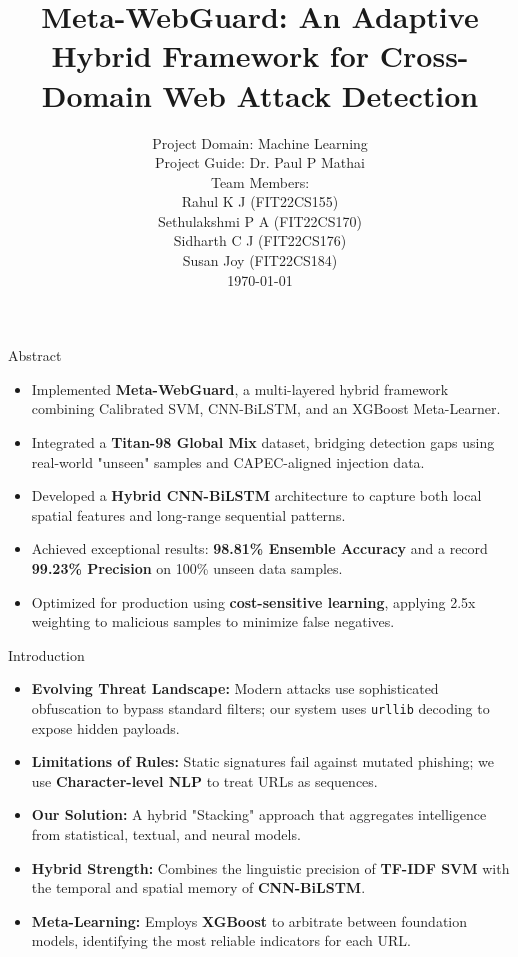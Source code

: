 \documentclass[aspectratio=169,xcolor=dvipsnames]{beamer}
\title{Meta-WebGuard: An Adaptive Hybrid Framework for Cross-Domain
Web Attack Detection}
\author{\small Project Domain: Machine Learning\\
Project Guide: Dr. Paul P Mathai\\
Team Members: \\
Rahul K J (FIT22CS155)\\
Sethulakshmi P A (FIT22CS170)\\
Sidharth C J (FIT22CS176)\\
Susan Joy (FIT22CS184)\\[0.5cm] %
\today
}
\begin{document}
\begin{frame}
    \titlepage
\end{frame}

\begin{frame}{Abstract}
\begin{itemize}
    \item Implemented \textbf{Meta-WebGuard}, a multi-layered hybrid framework combining Calibrated SVM, CNN-BiLSTM, and an XGBoost Meta-Learner.
    \item Integrated a \textbf{Titan-98 Global Mix} dataset, bridging detection gaps using real-world "unseen" samples and CAPEC-aligned injection data.
    \item Developed a \textbf{Hybrid CNN-BiLSTM} architecture to capture both local spatial features and long-range sequential patterns.
    \item Achieved exceptional results: \textbf{98.81\% Ensemble Accuracy} and a record \textbf{99.23\% Precision} on 100\% unseen data samples.
    \item Optimized for production using \textbf{cost-sensitive learning}, applying 2.5x weighting to malicious samples to minimize false negatives.
\end{itemize}
\end{frame}

\begin{frame}{Introduction}
\begin{itemize}
    \item \textbf{Evolving Threat Landscape:} Modern attacks use sophisticated obfuscation to bypass standard filters; our system uses \texttt{urllib} decoding to expose hidden payloads.
    \item \textbf{Limitations of Rules:} Static signatures fail against mutated phishing; we use \textbf{Character-level NLP} to treat URLs as sequences.
    \item \textbf{Our Solution:} A hybrid "Stacking" approach that aggregates intelligence from statistical, textual, and neural models.
    \item \textbf{Hybrid Strength:} Combines the linguistic precision of \textbf{TF-IDF SVM} with the temporal and spatial memory of \textbf{CNN-BiLSTM}.
    \item \textbf{Meta-Learning:} Employs \textbf{XGBoost} to arbitrate between foundation models, identifying the most reliable indicators for each URL.
\end{itemize}
\end{frame}
\end{document}
